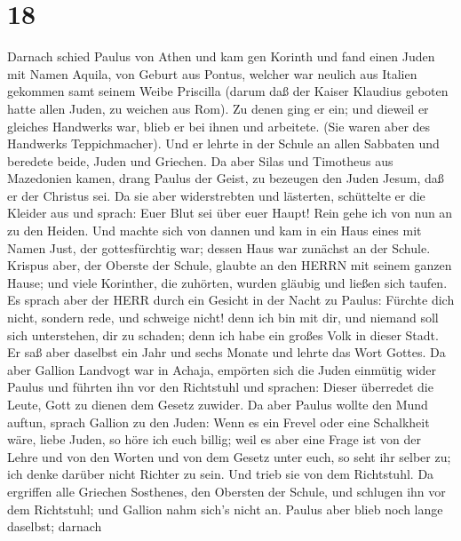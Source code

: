 \hypertarget{section-17}{%
\section{18}\label{section-17}}

 Darnach schied Paulus von Athen und kam gen Korinth
 und fand einen Juden mit Namen Aquila, von Geburt aus
Pontus, welcher war neulich aus Italien gekommen samt seinem Weibe
Priscilla (darum daß der Kaiser Klaudius geboten hatte allen Juden, zu
weichen aus Rom).  Zu denen ging er ein; und dieweil er
gleiches Handwerks war, blieb er bei ihnen und arbeitete. (Sie waren
aber des Handwerks Teppichmacher).  Und er lehrte in der
Schule an allen Sabbaten und beredete beide, Juden und Griechen.
 Da aber Silas und Timotheus aus Mazedonien kamen, drang
Paulus der Geist, zu bezeugen den Juden Jesum, daß er der Christus sei.
 Da sie aber widerstrebten und lästerten, schüttelte er die
Kleider aus und sprach: Euer Blut sei über euer Haupt! Rein gehe ich von
nun an zu den Heiden.  Und machte sich von dannen und kam in
ein Haus eines mit Namen Just, der gottesfürchtig war; dessen Haus war
zunächst an der Schule.  Krispus aber, der Oberste der
Schule, glaubte an den HERRN mit seinem ganzen Hause; und viele
Korinther, die zuhörten, wurden gläubig und ließen sich taufen.
 Es sprach aber der HERR durch ein Gesicht in der Nacht zu
Paulus: Fürchte dich nicht, sondern rede, und schweige nicht!
 denn ich bin mit dir, und niemand soll sich unterstehen,
dir zu schaden; denn ich habe ein großes Volk in dieser Stadt.
 Er saß aber daselbst ein Jahr und sechs Monate und lehrte
das Wort Gottes.  Da aber Gallion Landvogt war in Achaja,
empörten sich die Juden einmütig wider Paulus und führten ihn vor den
Richtstuhl  und sprachen: Dieser überredet die Leute, Gott
zu dienen dem Gesetz zuwider.  Da aber Paulus wollte den
Mund auftun, sprach Gallion zu den Juden: Wenn es ein Frevel oder eine
Schalkheit wäre, liebe Juden, so höre ich euch billig; 
weil es aber eine Frage ist von der Lehre und von den Worten und von dem
Gesetz unter euch, so seht ihr selber zu; ich denke darüber nicht
Richter zu sein.  Und trieb sie von dem Richtstuhl.
 Da ergriffen alle Griechen Sosthenes, den Obersten der
Schule, und schlugen ihn vor dem Richtstuhl; und Gallion nahm sich's
nicht an.  Paulus aber blieb noch lange daselbst; darnach
